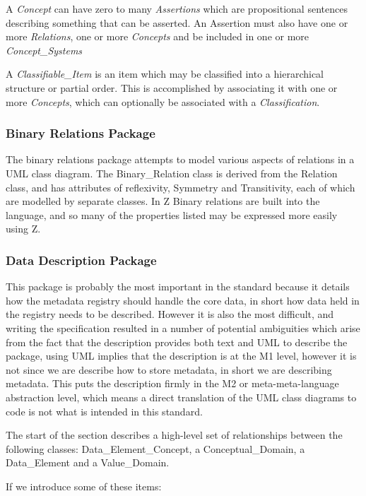 \documentclass{llncs}
\begin{document}
A \emph{Concept} can have zero to many \emph{Assertions} which are propositional sentences describing something that can be asserted. An Assertion must also have one or more \emph{Relations}, one or more \emph{Concepts} and be included in one or more \emph{Concept\_Systems}

A \emph{Classifiable\_Item} is an item which may be classified into a hierarchical structure or partial order. This is accomplished by associating it with one or more \emph{Concepts}, which can optionally be associated with a \emph{Classification}. 

\subsubsection{Binary Relations Package}
The binary relations package attempts to model various aspects of relations in a UML class diagram. The Binary\_Relation class is derived from the Relation class, and has attributes of reflexivity, Symmetry and Transitivity, each of which are modelled by separate classes. In Z Binary relations are built into the language, and so many of the properties listed may be expressed more easily using Z.

\subsubsection{Data Description Package}
This package is probably the most important in the standard because it details how the metadata registry should handle the core data, in short how data held in the registry needs to be described. However it is also the most difficult, and writing the specification resulted in a number of potential ambiguities which arise from the fact that the description provides both text and UML to describe the package, using UML implies that the description is at the M1 level, however it is not since we are describe how to store metadata, in short we are describing metadata. This puts the description firmly in the M2 or meta-meta-language abstraction level, which means a direct translation of the UML class diagrams to code is not what is intended in this standard.

The start of the section describes a high-level set of relationships between the following classes: Data\_Element\_Concept, a Conceptual\_Domain, a Data\_Element and a Value\_Domain. 





If we introduce some of these items:
\end{document}
